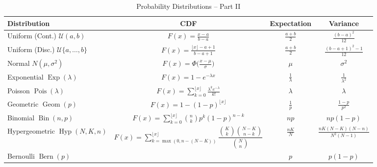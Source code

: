 \documentclass{article}
\begin{document}
\vspace{1em} %

\begin{table}[H]
\centering
\caption{Probability Distributions -- Part II}
\label{tab:dist_part2}
\renewcommand{\arraystretch}{1.3}
\begin{tabular}{l c c c}
\toprule
\textbf{Distribution} & \textbf{CDF} & \textbf{Expectation} & \textbf{Variance} \\
\midrule
\makecell{Uniform \\ (Cont.) \\ $\mathcal{U}(a,b)$} & $F(x)=\frac{x-a}{b-a}$ & $\frac{a+b}{2}$ & $\frac{(b-a)^2}{12}$ \\
\makecell{Uniform \\ (Disc.) \\ $\mathcal{U}\{a,\dots,b\}$} & $F(x)=\frac{\lfloor x\rfloor - a+1}{b-a+1}$ & $\frac{a+b}{2}$ & $\frac{(b-a+1)^2-1}{12}$ \\
\makecell{Normal \\ $N(\mu,\sigma^2)$} & $F(x)=\Phi\Big(\frac{x-\mu}{\sigma}\Big)$ & $\mu$ & $\sigma^2$ \\
\makecell{Exponential \\ $\operatorname{Exp}(\lambda)$} & $F(x)=1-e^{-\lambda x}$ & $\frac{1}{\lambda}$ & $\frac{1}{\lambda^2}$ \\
\makecell{Poisson \\ $\operatorname{Pois}(\lambda)$} & $F(x)=\sum_{k=0}^{\lfloor x\rfloor}\frac{\lambda^k e^{-\lambda}}{k!}$ & $\lambda$ & $\lambda$ \\
\makecell{Geometric \\ $\operatorname{Geom}(p)$} & $F(x)=1-(1-p)^{\lfloor x\rfloor}$ & $\frac{1}{p}$ & $\frac{1-p}{p^2}$ \\
\makecell{Binomial \\ $\operatorname{Bin}(n,p)$} & $F(x)=\sum_{k=0}^{\lfloor x\rfloor}\binom{n}{k}p^k(1-p)^{n-k}$ & $np$ & $np(1-p)$ \\
\makecell{Hypergeometric \\ $\operatorname{Hyp}(N,K,n)$} & $F(x)=\sum_{k=\max(0,n-(N-K))}^{\lfloor x\rfloor}\dfrac{\binom{K}{k}\binom{N-K}{n-k}}{\binom{N}{n}}$ & $\frac{nK}{N}$ & $\frac{nK(N-K)(N-n)}{N^2(N-1)}$ \\
\makecell{Bernoulli \\ $\operatorname{Bern}(p)$} & 
\makecell{$F(x)=\begin{cases} 0, & x<0 \\[5pt] 1-p, & 0\le x<1 \\[5pt] 1, & x\ge 1 \end{cases}$} & $p$ & $p(1-p)$ \\
\bottomrule
\end{tabular}
\end{table}
\end{document}
